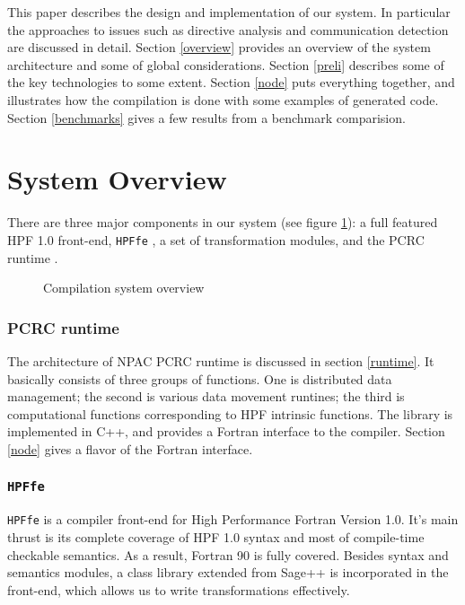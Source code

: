 This paper describes the design and implementation of our system.  In
particular the approaches to issues such as directive analysis and
communication detection are
discussed in detail.  Section \ref{overview} provides an overview of
the system architecture and some of global considerations.  Section
\ref{preli} describes some of the key technologies to some extent.
Section \ref{node} puts everything together, and illustrates how the
compilation is done with some examples of generated code.
Section \ref{benchmarks} gives a few results from a benchmark comparision.

\section{\label{overview} System Overview}

There are three major components in our system (see figure
\ref{infrastructure}): a full featured HPF 1.0 front-end, {\tt HPFfe}
\cite{hpffe:1}, a set of transformation modules, and the PCRC runtime
\cite{pcrc:2}.
\begin{figure}[bt]
\centerline{}
\caption{Compilation system overview}
\label{infrastructure}
\end{figure}

\subsubsection*{PCRC runtime}

The architecture of NPAC PCRC runtime is discussed in section \ref{runtime}.
It basically consists of three groups of functions.  One is distributed
data management; the second is various data movement runtines; 
the third is computational functions corresponding to HPF intrinsic
functions.  The library is implemented in C++, and provides a Fortran
interface to the compiler.  Section \ref{node} gives a
flavor of the Fortran interface.
 
\subsubsection*{\tt HPFfe}

{\tt HPFfe} is a compiler front-end for High Performance
Fortran Version 1.0.
It's main thrust is its complete coverage of HPF 1.0 syntax and
most of compile-time checkable semantics. As a result, Fortran 90 is
fully covered. Besides syntax and semantics modules, a class library
extended from Sage++ \cite{sage:1} is incorporated in the front-end,
which allows us to write transformations effectively.

